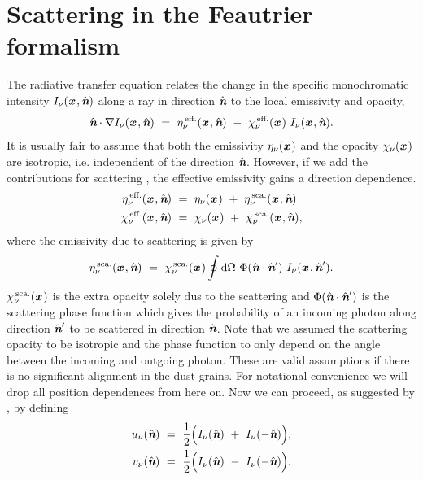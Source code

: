 \documentclass[a4paper,fleqn,usenatbib]{mnras}
\newcommand{\D}{\text{d}}
\newcommand{\x}{{\textit{\textbf{x}}}\,}
\newcommand{\n}{\hat{\textit{\textbf{n}}}}
\begin{document}
\section{Scattering in the Feautrier formalism}
\label{Scattering}

The radiative transfer equation relates the change in the specific monochromatic intensity $I_{\nu}(\x,\n)$ along a ray in direction $\n$ to the local emissivity and opacity,
\begin{equation}
	\n \cdot \nabla I_{\nu}(\x,\n) \ = \ \eta^{\,\text{eff.}}_{\nu}(\x,\n) \ - \ \chi^{\,\text{eff.}}_{\nu}(\x) \ I_{\nu}(\x,\n).
\label{transfer}
\end{equation}
It is usually fair to assume that both the emissivity $\eta_{\nu}(\x)$ and the opacity $\chi_{\nu}(\x)$ are isotropic, i.e. independent of the direction $\n$. However, if we add the contributions for scattering \citep[see e.g.][]{Steinacker2013}, the effective emissivity gains a direction dependence.
\begin{equation}
\begin{split}
		\eta^{\,\text{eff.}}_{\nu}(\x,\n) \ &= \ \eta_{\nu}(\x) \ + \ \eta^{\,\text{sca.}}_{\nu}(\x,\n) \\
		\chi^{\,\text{eff.}}_{\nu}(\x,\n)   \ &= \ \chi_{\nu}(\x) \ + \ \chi^{\,\text{sca.}}_{\nu}(\x,\n),
\end{split}
\label{scattering}
\end{equation}
where the emissivity due to scattering is given by
\begin{equation}
	\eta^{\,\text{sca.}}_{\nu}(\x,\n) \ = \ \chi^{\,\text{sca.}}_{\nu}(\x) \oint \D\Omega \ \Phi(\n\cdot\n') \ I_{\nu}(\x,\n').
\label{etasca}
\end{equation}
$\chi^{\,\text{sca.}}_{\nu}(\x)$ is the extra opacity solely dus to the scattering and $\Phi(\n\cdot\n')$ is the scattering phase function which gives the probability of an incoming photon along direction $\n'$ to be scattered in direction $\n$. Note that we assumed the scattering opacity to be isotropic and the phase function to only depend on the angle between the incoming and outgoing photon. These are valid assumptions if there is no significant alignment in the dust grains. For notational convenience we will drop all position dependences from here on. Now we can proceed, as suggested by \citet{Feautrier1964}, by defining
\begin{equation}
\begin{split}
		u_{\nu}(\n) \ &= \ \frac{1}{2}\Big( I_{\nu}(\n) \ + \ I_{\nu}(-\n) \Big), \\
		v_{\nu}(\n) \ &= \ \frac{1}{2}\Big( I_{\nu}(\n) \ - \ I_{\nu}(-\n) \Big).
\end{split}
\end{equation}
\end{document}
